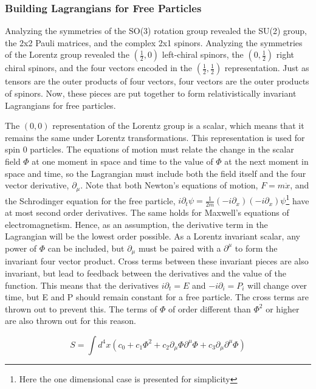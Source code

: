 \subsubsection{Building Lagrangians for Free Particles}

Analyzing the symmetries of the SO(3) rotation group revealed the SU(2) group, the 2x2 Pauli matrices, and the complex 2x1 spinors. Analyzing the symmetries of the Lorentz group revealed the $(\frac{1}{2}, 0)$ left-chiral spinors, the $(0, \frac{1}{2})$ right chiral spinors, and the four vectors encoded in the $(\frac{1}{2}, \frac{1}{2})$ representation. Just as tensors are the outer products of four vectors, four vectors are the outer products of spinors. Now, these pieces are put together to form relativistically invariant Lagrangians for free particles.  

The $(0,0)$ representation of the Lorentz group is a scalar, which means that it remains the same under Lorentz transformations. This representation is used for spin 0 particles. The equations of motion must relate the change in the scalar field $\Phi$ at one moment in space and time to the value of $\Phi$ at the next moment in space and time, so the Lagrangian must include both the field itself and the four vector derivative, $\partial_\mu$. Note that both Newton's equations of motion, $F=m\ddot{x}$, and the Schrodinger equation for the free particle, $i\partial_t\psi = \frac{1}{2m}(-i\partial_x)(-i\partial_x)\psi$\footnote{Here the one dimensional case is presented for simplicity} have at most second order derivatives. The same holds for Maxwell's equations of electromagnetism. Hence, as an assumption, the derivative term in the Lagrangian will be the lowest order possible. As a Lorentz invariant scalar, any power of $\Phi$ can be included, but $\partial_\mu$ must be paired with a $\partial^\mu$ to form the invariant four vector product. Cross terms between these invariant pieces are also invariant, but lead to feedback between the derivatives and the value of the function. This means that the derivatives $i\partial_t = E$ and $-i\partial_i = P_i$ will change over time, but E and P should remain constant for a free particle. The cross terms are thrown out to prevent this. The terms of $\Phi$ of order different than $\Phi^2$ or higher are also thrown out for this reason.  

\begin{equation}
S = \int d^4x \left(c_0 + c_1 \Phi^2  
+ c_2 \partial_\mu\Phi\partial^\mu\Phi + c_3 \partial_\mu \partial^\mu \Phi\right)
\end{equation}

